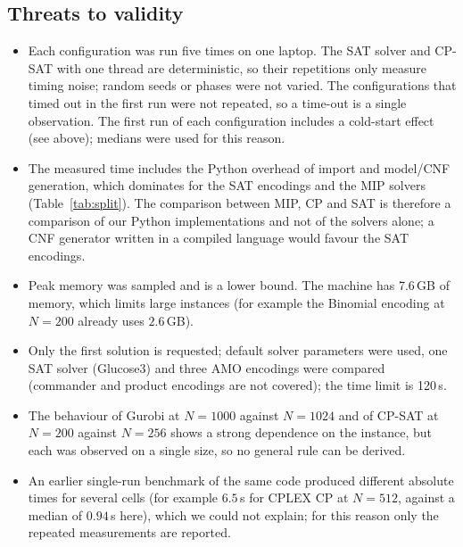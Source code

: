 \documentclass[a4paper,fleqn]{cas-sc}
\begin{document}
\subsection{Threats to validity}
\begin{itemize}
 \item Each configuration was run five times on one laptop. The SAT solver and CP-SAT with one thread are deterministic, so their repetitions only measure timing noise; random seeds or phases were not varied. The configurations that timed out in the first run were not repeated, so a time-out is a single observation. The first run of each configuration includes a cold-start effect (see above); medians were used for this reason.
 \item The measured time includes the Python overhead of import and model/CNF generation, which dominates for the SAT encodings and the MIP solvers (Table~\ref{tab:split}). The comparison between MIP, CP and SAT is therefore a comparison of our Python implementations and not of the solvers alone; a CNF generator written in a compiled language would favour the SAT encodings.
 \item Peak memory was sampled and is a lower bound. The machine has 7.6\,GB of memory, which limits large instances (for example the Binomial encoding at $N=200$ already uses $2.6$\,GB).
 \item Only the first solution is requested; default solver parameters were used, one SAT solver (Glucose3) and three AMO encodings were compared (commander and product encodings are not covered); the time limit is 120\,s.
 \item The behaviour of Gurobi at $N=1000$ against $N=1024$ and of CP-SAT at $N=200$ against $N=256$ shows a strong dependence on the instance, but each was observed on a single size, so no general rule can be derived.
 \item An earlier single-run benchmark of the same code produced different absolute times for several cells (for example $6.5$\,s for CPLEX CP at $N=512$, against a median of $0.94$\,s here), which we could not explain; for this reason only the repeated measurements are reported.
\end{itemize}

\FloatBarrier
\end{document}
